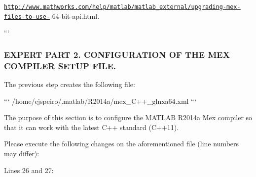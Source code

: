 \begin{DoxyPre}\href{http://www.mathworks.com/help/matlab/matlab_external/upgrading-mex-files-to-use-}{\tt http://www.mathworks.com/help/matlab/matlab\_external/upgrading-mex-files-to-use-}
64-bit-api.html.
\begin{quotation}
\begin{quotation}


\end{quotation}


\end{quotation}
```\end{DoxyPre}



\begin{DoxyPre}\subsubsection*{EXPERT PART 2. CONFIGURATION OF THE MEX COMPILER SETUP FILE.}\end{DoxyPre}



\begin{DoxyPre}\end{DoxyPre}



\begin{DoxyPre}The previous step creates the following file:\end{DoxyPre}



\begin{DoxyPre}```
/home/ejspeiro/.matlab/R2014a/mex\_C++\_glnxa64.xml
```\end{DoxyPre}



\begin{DoxyPre}The purpose of this section is to configure the MATLAB R2014a Mex compiler so
that it can work with the latest C++ standard (C++11).\end{DoxyPre}



\begin{DoxyPre}Please execute the following changes on the aforementioned file (line numbers
may differ):\end{DoxyPre}



\begin{DoxyPre}Lines 26 and 27:\end{DoxyPre}



